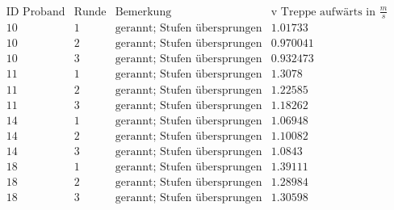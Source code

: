 \[\begin{array}{cccc}
 \text{ID Proband} & \text{Runde} & \text{Bemerkung} & \text{v Treppe aufw{\" a}rts in }\frac{m}{s} \\
 10 & 1 & \text{gerannt; Stufen {\" u}bersprungen} & 1.01733 \\
 10 & 2 & \text{gerannt; Stufen {\" u}bersprungen} & 0.970041 \\
 10 & 3 & \text{gerannt; Stufen {\" u}bersprungen} & 0.932473 \\
 11 & 1 & \text{gerannt; Stufen {\" u}bersprungen} & 1.3078 \\
 11 & 2 & \text{gerannt; Stufen {\" u}bersprungen} & 1.22585 \\
 11 & 3 & \text{gerannt; Stufen {\" u}bersprungen} & 1.18262 \\
 14 & 1 & \text{gerannt; Stufen {\" u}bersprungen} & 1.06948 \\
 14 & 2 & \text{gerannt; Stufen {\" u}bersprungen} & 1.10082 \\
 14 & 3 & \text{gerannt; Stufen {\" u}bersprungen} & 1.0843 \\
 18 & 1 & \text{gerannt; Stufen {\" u}bersprungen} & 1.39111 \\
 18 & 2 & \text{gerannt; Stufen {\" u}bersprungen} & 1.28984 \\
 18 & 3 & \text{gerannt; Stufen {\" u}bersprungen} & 1.30598 \\
\end{array}\]

